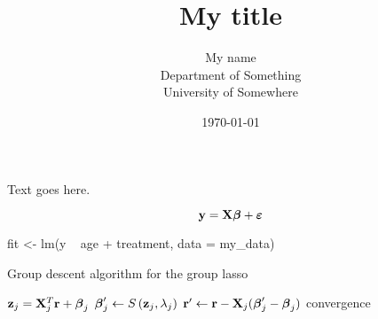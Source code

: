 \documentclass[11pt]{article}
\title{My title}
\author{My name \\ Department of Something \\ University of Somewhere}
\date{\today}
\begin{document}
\maketitle


Text goes here.

$$ \mathbf{y} = \mathbf{X}\boldsymbol{\beta} + \boldsymbol{\varepsilon} $$

\begin{code}
  fit <- lm(y ~ age + treatment, data = my_data)
\end{code}

\begin{algorithm}
\caption{\label{Alg:gd-lasso} Group descent algorithm for the group lasso}
  \begin{algorithmic}
    \Repeat
      \State $\mathbf{z}_j = \mathbf{X}_j^T\mathbf{r} + \boldsymbol{\beta}_j$
      \State $\boldsymbol{\beta}_j' \gets S\left(\mathbf{z}_j,\lambda_j\right)$
      \State $\mathbf{r}' \gets \mathbf{r} - \mathbf{X}_j(\boldsymbol{\beta}_j'-\boldsymbol{\beta}_j)$
    \EndFor
    \Until convergence
  \end{algorithmic}
\end{algorithm}
\end{document}
